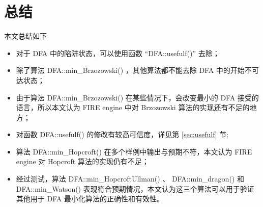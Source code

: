 \chapter{总结}

本文总结如下
\begin{itemize}
    \item 对于 DFA 中的陷阱状态，可以使用函数 “DFA::usefulf()” 去除；
    \item 除了算法 DFA::min\_Brzozowski() ，其他算法都不能去除 DFA 中的开始不可达状态；
    \item 由于算法 DFA::min\_Brzozowski() 在某些情况下，会改变最小的 DFA 接受的语言，所以本文认为 FIRE engine 中对 Brzozowski 算法的实现还有不足的地方；
    \item 对函数 DFA::usefulf() 的修改有较高可信度，详见第 \ref{sec:usefulf} 节;
    \item 算法 DFA::min\_Hopcroft() 在多个样例中输出与预期不符，本文认为 FIRE engine 对 Hopcroft 算法的实现仍有不足；
    \item 经过测试，算法 DFA::min\_HopcroftUllman() 、 DFA::min\_dragon() 和 DFA::min\_Watson() 表现符合预期情况，本文认为这三个算法可以用于验证其他用于 DFA 最小化算法的正确性和有效性。
\end{itemize}


